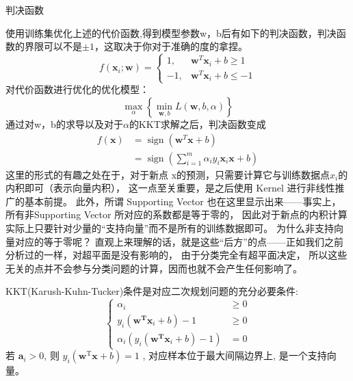 \begin{outline}
\1 判决函数

使用训练集优化上述的代价函数,得到模型参数w，b后有如下的判决函数，判决函数的界限可以不是$\pm 1$，这取决于你对于准确的度的拿捏。
\begin{equation}
	f\left(\mathbf{x}_{i} ; \mathbf{w}\right)=\left\{\begin{array}{cc}
		1, & \mathbf{w}^{T} \mathbf{x}_{i}+b \geq 1 \\
		-1, & \mathbf{w}^{T} \mathbf{x}_{i}+b \leq-1
		\end{array}\right.
\end{equation}
对代价函数进行优化的优化模型：
\begin{equation}
	\max _{\alpha}\left\{\min _{\mathbf{w}, b} L(\mathbf{w}, b, \alpha)\right\}
\end{equation}
通过对w，b的求导以及对于$\alpha$的KKT求解之后，判决函数变成
\begin{equation}
	\begin{aligned}
		f(\mathbf{x}) &=\operatorname{sign}\left(\left.\mathbf{w}^{T} \mathbf{x}+b\right)\right.\\
		&=\operatorname{sign}\left(\sum_{i=1}^{m} \alpha_{i} y_{i} \mathbf{x}_{i} \mathbf{x}+b\right)
		\end{aligned}
\end{equation}
这里的形式的有趣之处在于，对于新点 x的预测，只需要计算它与训练数据点$x_{i}$的内积即可（表示向量内积），
这一点至关重要，是之后使用 Kernel 进行非线性推广的基本前提。
此外，所谓 Supporting Vector 也在这里显示出来——事实上，
所有非Supporting Vector 所对应的系数都是等于零的，
因此对于新点的内积计算实际上只要针对少量的“支持向量”而不是所有的训练数据即可。
为什么非支持向量对应的等于零呢？
直观上来理解的话，就是这些“后方”的点——正如我们之前分析过的一样，对超平面是没有影响的，
由于分类完全有超平面决定，
所以这些无关的点并不会参与分类问题的计算，因而也就不会产生任何影响了。

KKT(Karush-Kuhn-Tucker)条件是对应二次规划问题的充分必要条件:
\begin{equation}
	\left\{\begin{aligned}
		\alpha_{i} & \geqslant 0 \\
		y_{i}\left(\mathbf{w}^{\mathbf{T}} \mathbf{x}_{i}+b\right)-1 & \geqslant 0 \\
		\alpha_{i}\left(y_{i}\left(\mathbf{w}^{\mathbf{T}} \mathbf{x}_{i}+b\right)-1\right) &=0
		\end{aligned}\right.
\end{equation}
若 $ \boldsymbol{a}_{i}>0 $, 则  $y_{i}\left(\mathbf{w}^{\mathrm{T}} \mathbf{x}+b\right)=1$ , 对应样本位于最大间隔边界上, 是一个支持向量。


\end{outline}
